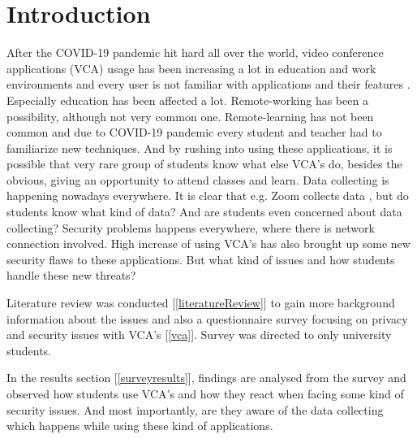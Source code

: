 \documentclass[utf8,english]{gradu3}
\begin{document}
\mainmatter


\sloppypar 



\chapter{Introduction}
\label{introduction}
After the COVID-19 pandemic hit hard all over the world, video conference applications (VCA) usage has been increasing a lot in education and work environments and every user is not familiar with applications and their features \parencite{zsolt2020}. Especially education has been affected a lot. Remote-working has been a possibility, although not very common one. Remote-learning has not been common and due to COVID-19 pandemic every student and teacher had to familiarize new techniques. And by rushing into using these applications, it is possible that very rare group of students know what else VCA's do, besides the obvious, giving an opportunity to attend classes and learn. Data collecting is happening nowadays everywhere. It is clear that e.g. Zoom collects data \parencite{zoomdata}, but do students know what kind of data? And are students even concerned about data collecting?
Security problems happens everywhere, where there is network connection involved. High increase of using VCA's has also brought up some new security flaws to these applications. But what kind of issues and how students handle these new threats?
%

Literature review was conducted [\ref{literatureReview}] to gain more background information about the issues and also a questionnaire survey focusing on privacy and security issues with VCA's [\ref{vca}]. Survey was directed to only university students.
%

%
In the results section [\ref{surveyresults}], findings are analysed from the survey and observed how students use VCA's and how they react when facing some kind of security issues. And most importantly, are they aware of the data collecting which happens while using these kind of applications.
\end{document}
